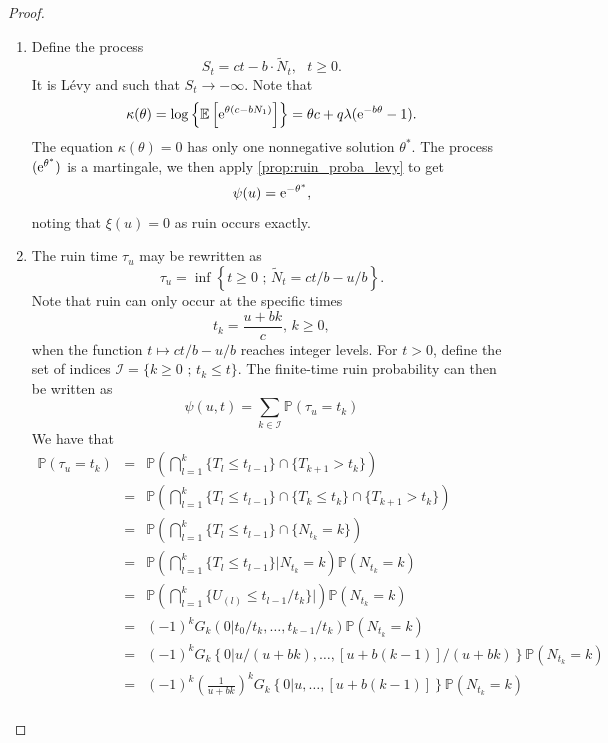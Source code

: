 \begin{proof}
\begin{enumerate}
  \item Define the process 
  \[
  S_t = ct -  b\cdot\tilde{N}_t,\text{ }t\geq0.
  \]
  It is L\'evy and such that $S_t\rightarrow-\infty$. Note that 
  \[
  \kappa(\theta) = \log\left\{\mathbb{E}\left[\mathrm{e}^{\theta(c-bN_1)}\right]\right\} = \theta c+q\lambda(\mathrm{e}^{-b\theta}-1).
  \]
  The equation $\kappa(\theta) = 0$ has only one nonnegative solution $\theta^{\ast}$. The process $(\mathrm{e}^{\theta^{\ast}})$ is a martingale, we then apply \cref{prop:ruin_proba_levy} to get 
  $$
  \psi(u) = \mathrm{e}^{-\theta^{\ast}},
  $$
  noting that $\xi(u) = 0$ as ruin occurs exactly.
  \item The ruin time $\tau_u$ may be rewritten as 
\begin{equation*}
\tau_u = \inf\left\{t\geq 0\text{ ; }\tilde{N}_t = {ct}/{b} - {u}/{b}\right\}.
\end{equation*}
Note that ruin can only occur at the specific times 
$$
t_k = \frac{u+bk}{c}\text{, }k \geq0,
$$
when the function $t\mapsto {ct}/{b} - {u}/{b}$ reaches integer levels. For $t>0$, define the set of indices $\mathcal{I} = \{k\geq0\text{ ; }t_k\leq t\}$. The finite-time ruin probability can then be written as 
\begin{equation*}
\psi(u,t)=\sum_{k\in\mathcal{I}}\mathbb{P}(\tau_u = t_k)
\end{equation*}
We have that 
\begin{eqnarray*}
\mathbb{P}(\tau_u = t_k) &=& \mathbb{P}\left(\bigcap_{l = 1}^{k}\{T_l\leq t_{l-1}\}\cap\{T_{k+1}> t_k\}\right)\\
&=& \mathbb{P}\left(\bigcap_{l = 1}^{k}\{T_l\leq t_{l-1}\}\cap\{T_{k} \leq t_k\}\cap\{T_{k+1} > t_k\}\right)\\
&=& \mathbb{P}\left(\bigcap_{l = 1}^{k}\{T_l\leq t_{l-1}\}\cap\{N_{t_k} = k\}\right)\\
&=& \mathbb{P}\left(\bigcap_{l = 1}^{k}\{T_l\leq t_{l-1}\}|N_{t_k} = k\right)\mathbb{P}(N_{t_k} = k)\\
&=&\mathbb{P}\left(\bigcap_{l = 1}^{k}\{U_{(l)}\leq t_{l-1}/t_k\}|\right)\mathbb{P}(N_{t_k} = k)\\
&=&(-1)^kG_{k}(0|t_0/t_k, \ldots, t_{k-1}/t_k)\mathbb{P}(N_{t_k} = k)\\
&=&(-1)^kG_{k}\left\{0|u/(u+bk), \ldots, [u+b(k-1)]/(u+bk)\right\}\mathbb{P}(N_{t_k} = k)\\
&=&(-1)^k\left(\frac{1}{u+bk}\right)^{k}G_{k}\left\{0|u, \ldots, [u+b(k-1)]\right\}\mathbb{P}(N_{t_k} = k)\\

\end{eqnarray*}
\end{enumerate}
\end{proof}
